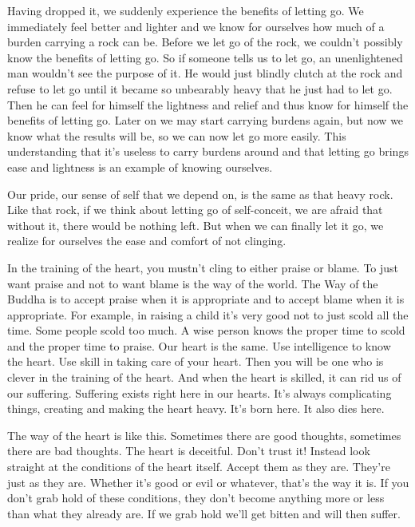Having dropped it, we suddenly experience the benefits of letting go. We immediately feel better and lighter and we know for ourselves how much of a burden carrying a rock can be. Before we let go of the rock, we couldn't possibly know the benefits of letting go. So if someone tells us to let go, an unenlightened man wouldn't see the purpose of it. He would just blindly clutch at the rock and refuse to let go until it became so unbearably heavy that he just had to let go. Then he can feel for himself the lightness and relief and thus know for himself the benefits of letting go. Later on we may start carrying burdens again, but now we know what the results will be, so we can now let go more easily. This understanding that it's useless to carry burdens around and that letting go brings ease and lightness is an example of knowing ourselves. 

Our pride, our sense of self that we depend on, is the same as that heavy rock. Like that rock, if we think about letting go of self-conceit, we are afraid that without it, there would be nothing left. But when we can finally let it go, we realize for ourselves the ease and comfort of not clinging. 

In the training of the heart, you mustn't cling to either praise or blame. To just want praise and not to want blame is the way of the world. The Way of the Buddha is to accept praise when it is appropriate and to accept blame when it is appropriate. For example, in raising a child it's very good not to just scold all the time. Some people scold too much. A wise person knows the proper time to scold and the proper time to praise. Our heart is the same. Use intelligence to know the heart. Use skill in taking care of your heart. Then you will be one who is clever in the training of the heart. And when the heart is skilled, it can rid us of our suffering. Suffering exists right here in our hearts. It's always complicating things, creating and making the heart heavy. It's born here. It also dies here. 

The way of the heart is like this. Sometimes there are good thoughts, sometimes there are bad thoughts. The heart is deceitful. Don't trust it! Instead look straight at the conditions of the heart itself. Accept them as they are. They're just as they are. Whether it's good or evil or whatever, that's the way it is. If you don't grab hold of these conditions, they don't become anything more or less than what they already are. If we grab hold we'll get bitten and will then suffer. 

